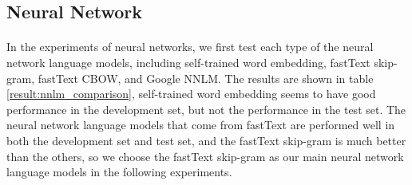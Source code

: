 \documentclass[12pt]{article}
\begin{document}
\begin{CJK*}{UTF8}{bkai}
\begin{spacing}{1.77}

\subsection{Neural Network}
\paragraph{}
In the experiments of neural networks, we first test each type of the neural network language models, including self-trained word embedding, fastText skip-gram, fastText CBOW, and Google NNLM. The results are shown in table \ref{result:nnlm_comparison}, self-trained word embedding seems to have good performance in the development set, but not the performance in the test set. The neural network language models that come from fastText are performed well in both the development set and test set, and the fastText skip-gram is much better than the others, so we choose the fastText skip-gram as our main neural network language models in the following experiments.


\end{spacing}
\end{CJK*}
\end{document}
